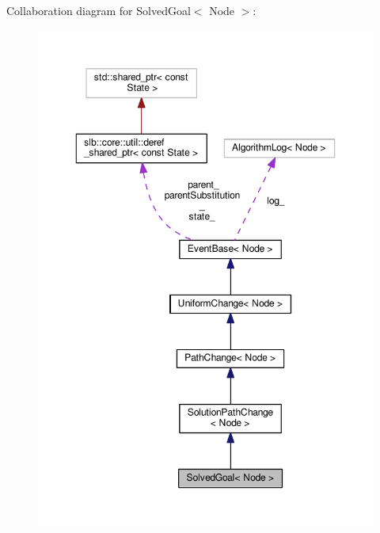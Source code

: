 Collaboration diagram for Solved\+Goal$<$ Node $>$\+:\nopagebreak
\begin{figure}[H]
\begin{center}
\leavevmode
\includegraphics[width=350pt]{structSolvedGoal__coll__graph}
\end{center}
\end{figure}
